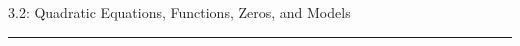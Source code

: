 \documentclass[11pt]{article}
\begin{document}
\newcommand{\dsp}{\displaystyle}
\newcommand{\ihat}{{\bf{i}}}
\newcommand{\jhat}{{\bf{j}}}
\newcommand{\khat}{{\bf{k}}}
\newcommand{\Fhat}{{\bf{F}}}
\newcommand{\myyellow}{\colorbox[cmyk]{0,0,.15,0}}
\newcommand{\mygreen}{\colorbox[cmyk]{.05,0,.05,0}}
\newcommand{\mygrey}{\colorbox[cmyk]{0,0,0,.1}}
\newcommand{\xsblank}{\underline{\ \ \ \ \ \ \ }}
\newcommand{\smblank}{\underline{\ \ \ \ \ \ \ \ \ \ \ \ \ }}
\newcommand{\mdblank}{\underline{\ \ \ \ \ \ \ \ \ \ \ \ \ \ \ \ \ \ \ \ \ \ \ \ \ }}
\newcommand{\lgblank}{\underline{\ \ \ \ \ \ \ \ \ \ \ \ \ \ \ \ \ \ \ \ \ \ \ \ \ \ \ \ \ \ \ \ \ \ \ \ \ \ \ \ }}
\newcommand{\xlblank}{\underline{\ \ \ \ \ \ \ \ \ \ \ \ \ \ \ \ \ \ \ \ \ \ \ \ \ \ \ \ \ \ \ \ \ \ \ \ \ \ \ \ \ \ \ \ \ \ \ \ \ \ \ \ \ \ \ }}
\newcommand{\one }{\Large \ding{192}\normalsize}
\newcommand{\two }{\Large \ding{193}\normalsize}
\newcommand{\three}{\Large \ding{194}\normalsize}
\newcommand{\four}{\Large \ding{195}\normalsize}
\newcommand{\five}{\Large \ding{196}\normalsize}
\thispagestyle{empty}

\noindent
\sffamily
\begin{center}
\huge 3.2:  Quadratic Equations, Functions, Zeros, and Models\normalsize

\rule{7in}{2pt}
\end{center}
\end{document}
